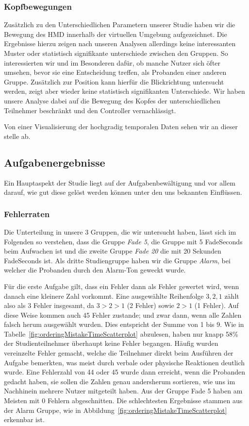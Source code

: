 \subsubsection{Kopfbewegungen}

Zusätzlich zu den Unterschiedlichen Parametern unserer Studie haben wir die Bewegung des HMD innerhalb der virtuellen Umgebung aufgezeichnet. 
Die Ergebnisse hierzu zeigen nach unseren Analysen allerdings keine interessanten Muster oder statistisch signifikante unterschiede zwischen den Gruppen. 
So interessierten wir und im Besonderen dafür, ob manche Nutzer sich öfter umsehen, bevor sie eine Entscheidung treffen, als Probanden einer anderen Gruppe. 
Zusätzlich zur Position kann hierfür die Blickrichtung untersucht werden, zeigt aber wieder keine statistisch signifikanten Unterschiede.
Wir haben unsere Analyse dabei auf die Bewegung des Kopfes der unterschiedlichen Teilnehmer beschränkt und den Controller vernachlässigt.

Von einer Visualisierung der hochgradig temporalen Daten sehen wir an dieser stelle ab.

\subsection{Aufgabenergebnisse} 

Ein Hauptaspekt der Studie liegt auf der Aufgabenbewältigung und vor allem darauf, wie gut diese gelöst werden können unter den uns bekannten Einflüssen. 

\subsubsection{Fehlerraten}

Die Unterteilung in unsere 3 Gruppen, die wir untersucht haben, lässt sich im Folgenden so verstehen, dass die Gruppe \textit{Fade 5}, die Gruppe mit 5 FadeSeconds beim Aufwachen ist und die zweite Gruppe \textit{Fade 20} die mit 20 Sekunden FadeSeconds ist. Als dritte Studiengruppe haben wir die Gruppe \textit{Alarm}, bei welcher die Probanden durch den Alarm-Ton geweckt wurde.

Für die erste Aufgabe gilt, dass ein Fehler dann als Fehler gewertet wird, wenn danach eine kleinere Zahl vorkommt. Eine ausgewählte Reihenfolge $3, 2, 1$ zählt also als 3 Fehler insgesamt, da $3 > 2 > 1$ (2 Fehler) sowie $2 > 1$ (1 Fehler). Auf diese Weise kommen auch 45 Fehler zustande; und zwar dann, wenn alle Zahlen falsch herum ausgewählt wurden. Dies entspricht der Summe von 1 bis 9.
Wie in Tabelle~\ref{fig:orderingMistakeTimeScatterplot} abzulesen, haben nur knapp 58\% der Studienteilnehmer überhaupt keine Fehler begangen. Häufig wurden vereinzelte Fehler gemacht, welche die Teilnehmer direkt beim Ausführen der Aufgabe bemerkten, was meist durch verbale oder physische Reaktionen deutlich wurde. 
Eine Fehlerzahl von 44 oder 45 wurde dann erreicht, wenn die Probanden gedacht haben, sie sollen die Zahlen genau andersherum sortieren, wie uns im Nachhinein mehrere Nutzer mitgeteilt haben.
Aus der Gruppe Fade 5 haben am Meisten mit 0 Fehlern abgeschnitten. Die schlechtesten Ergebnisse stammen aus der Alarm Gruppe, wie in Abbildung~\ref{fig:orderingMistakeTimeScatterplot} erkennbar ist.

